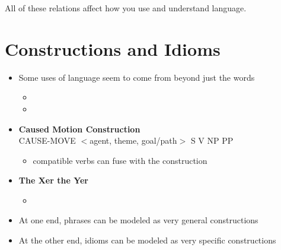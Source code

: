 \documentclass[a4paper,landscape,headrule,footrule,xetex]{foils}
\begin{document}
All of these relations affect how you use and understand language.
  
\section{Constructions and Idioms}


\begin{itemize}
\item Some uses of language seem to come from beyond just the words
  \begin{itemize}
  \item {}
  \item {}
  \end{itemize}
\item \textbf{Caused Motion Construction}
  \\ CAUSE-MOVE $<$agent, theme, goal/path$>$ \into S V NP PP
  \begin{itemize}
  \item compatible verbs can fuse with the construction
  \end{itemize}
\item \textbf{The Xer the Yer}
  \begin{itemize}
  \item {}
  \end{itemize}
\item At one end, phrases can be modeled as very general constructions
\item At the other end, idioms can be modeled as very specific constructions
\end{itemize}

\end{document}
